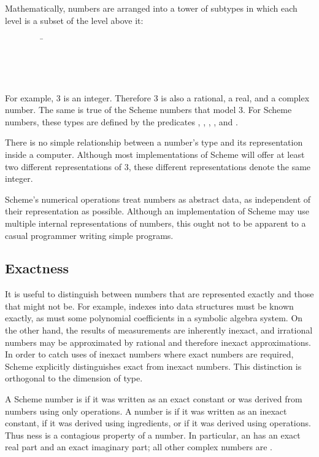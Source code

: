 \vest Mathematically, numbers are arranged into a tower of subtypes
in which each level is a subset of the level above it:
\begin{tabbing}
\ \ \ \ \ \ \ \ \ \= \\
\>  \\
\>  \\
\>  \\
\> 
\end{tabbing}

For example, 3 is an integer.  Therefore 3 is also a rational,
a real, and a complex number.  The same is true of the Scheme numbers
that model 3.  For Scheme numbers, these types are defined by the
predicates , , , ,
and .

There is no simple relationship between a number's type and its
representation inside a computer.  Although most implementations of
Scheme will offer at least two different representations of 3, these
different representations denote the same integer.

Scheme's numerical operations treat numbers as abstract data, as
independent of their representation as possible.  Although an implementation
of Scheme may use multiple internal representations of
numbers, this ought not to be apparent to a casual programmer writing
simple programs.

\subsection{Exactness}

 \label{exactly}

It is useful to distinguish between numbers that are
represented exactly and those that might not be.  For example, indexes
into data structures must be known exactly, as must some polynomial
coefficients in a symbolic algebra system.  On the other hand, the
results of measurements are inherently inexact, and irrational numbers
may be approximated by rational and therefore inexact approximations.
In order to catch uses of inexact numbers where exact numbers are
required, Scheme explicitly distinguishes exact from inexact numbers.
This distinction is orthogonal to the dimension of type.

A Scheme number is
 if it was written as an exact constant or was derived from
 numbers using only  operations.  A number is
 if it was written as an inexact constant,
if it was
derived using  ingredients, or if it was derived using
 operations. Thus ness is a contagious
property of a number.
In particular, an  has an exact real part
and an exact imaginary part; all other complex numbers are .

